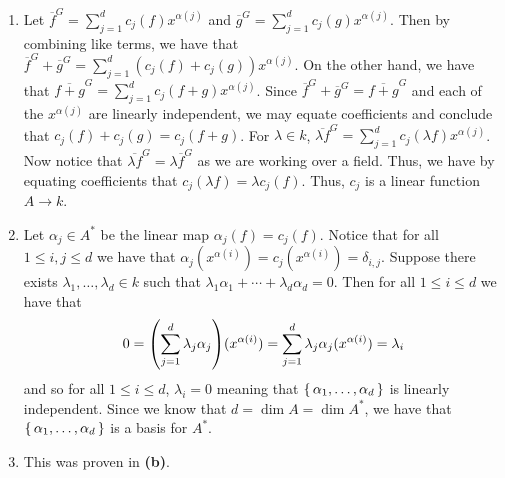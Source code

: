 \documentclass[letterpaper, 11pt, oneside]{book}
\begin{document}
\begin{sol}\label{ex:UAG_2.2.10}
  \begin{enumerate}
    \item Let $\overline{f}^{G} = \sum_{j = 1}^{d} c_{j}(f) x^{\alpha(j)}$ and $\overline{g}^{G} = \sum_{j = 1}^{d} c_{j}(g) x^{\alpha(j)}$.
          Then by combining like terms, we have that $\overline{f}^{G} + \overline{g}^{G} = \sum_{j = 1}^{d} (c_{j}(f) + c_{j}(g)) x^{\alpha(j)}$.
          On the other hand, we have that $\overline{f + g}^{G} = \sum_{j = 1}^{d} c_{j}(f + g) x^{\alpha(j)}$.
          Since $\overline{f}^{G} + \overline{g}^{G} = \overline{f + g}^{G}$ and each of the $x^{\alpha(j)}$ are linearly independent, we may equate coefficients and conclude that $c_{j}(f) + c_{j}(g) = c_{j}(f + g)$.
          For $\lambda \in k$, $\overline{\lambda f}^{G} = \sum_{j = 1}^{d} c_{j}(\lambda f) x^{\alpha(j)}$.
          Now notice that $\overline{\lambda f}^{G} = \lambda \overline{f}^{G}$ as we are working over a field.
          Thus, we have by equating coefficients that $c_{j}(\lambda f) = \lambda c_{j}(f)$.
          Thus, $c_{j}$ is a linear function $A \to k$.
    \item Let $\alpha_{j} \in A^{*}$ be the linear map $\alpha_{j}(f) = c_{j}(f)$.
          Notice that for all $1 \leq i, j \leq d$ we have that $\alpha_{j}(x^{\alpha(i)}) = c_{j}(x^{\alpha(i)}) = \delta_{i,j}$.
          Suppose there exists $\lambda_{1}, \ldots, \lambda_{d} \in k$ such that $\lambda_{1}\alpha_{1} + \cdots + \lambda_{d}\alpha_{d} = 0$.
          Then for all $1 \leq i \leq d$ we have that
          \[
            0 = \pqty{\sum_{j = 1}^{d} \lambda_{j} \alpha_{j}}(x^{\alpha(i)}) = \sum_{j = 1}^{d} \lambda_{j} \alpha_{j}(x^{\alpha(i)}) = \lambda_{i}
          \]
          and so for all $1 \leq i \leq d$, $\lambda_{i} = 0$ meaning that $\set{\alpha_{1}, \ldots, \alpha_{d}}$ is linearly independent.
          Since we know that $d = \dim A = \dim A^{*}$, we have that $\set{\alpha_{1}, \ldots, \alpha_{d}}$ is a basis for $A^{*}$.
    \item This was proven in \textbf{(b)}.
  \end{enumerate}
\end{sol}
\end{document}
